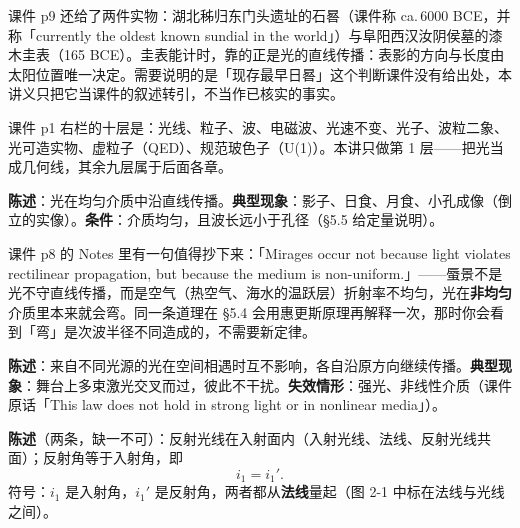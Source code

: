 \documentclass[11pt]{ctexart}
\begin{document}
课件 p9 还给了两件实物：湖北秭归东门头遗址的石晷（课件称 ca.\,6000 BCE，并称「currently the oldest known sundial in the world」）与阜阳西汉汝阴侯墓的漆木圭表（165 BCE）。圭表能计时，靠的正是光的直线传播：表影的方向与长度由太阳位置唯一决定。需要说明的是「现存最早日晷」这个判断课件没有给出处，本讲义只把它当课件的叙述转引，不当作已核实的事实。

课件 p1 右栏的十层是：光线、粒子、波、电磁波、光速不变、光子、波粒二象、光可造实物、虚粒子（QED）、规范玻色子（U(1)）。本讲只做第 1 层——把光当成几何线，其余九层属于后面各章。



\textbf{陈述}：光在均匀介质中沿直线传播。\textbf{典型现象}：影子、日食、月食、小孔成像（倒立的实像）。\textbf{条件}：介质均匀，且波长远小于孔径（§5.5 给定量说明）。

课件 p8 的 Notes 里有一句值得抄下来：「Mirages occur not because light violates rectilinear propagation, but because the medium is non-uniform.」——蜃景不是光不守直线传播，而是空气（热空气、海水的温跃层）折射率不均匀，光在\textbf{非均匀}介质里本来就会弯。同一条道理在 §5.4 会用惠更斯原理再解释一次，那时你会看到「弯」是次波半径不同造成的，不需要新定律。

\textbf{陈述}：来自不同光源的光在空间相遇时互不影响，各自沿原方向继续传播。\textbf{典型现象}：舞台上多束激光交叉而过，彼此不干扰。\textbf{失效情形}：强光、非线性介质（课件原话「This law does not hold in strong light or in nonlinear media」）。


\textbf{陈述}（两条，缺一不可）：反射光线在入射面内（入射光线、法线、反射光线共面）；反射角等于入射角，即
\[
i_1=i_1' .
\]
符号：$i_1$ 是入射角，$i_1'$ 是反射角，两者都从\textbf{法线}量起（图 2-1 中标在法线与光线之间）。
\end{document}

